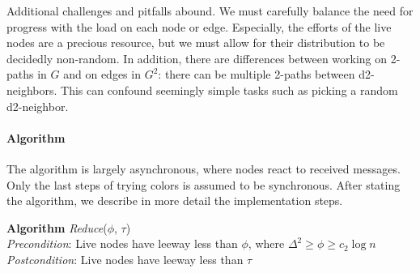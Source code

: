 Additional challenges and pitfalls abound. We must carefully balance the need for progress with the load on each node or edge. Especially, the efforts of the live nodes are a precious resource, but we must allow for their distribution to be decidedly non-random.  
In addition, there are differences between working on 2-paths in $G$ and on edges in $G^2$: there can be multiple 2-paths between d2-neighbors. This can confound seemingly simple tasks such as picking a random d2-neighbor.

\paragraph*{Algorithm} The algorithm  is largely asynchronous, where nodes react to received messages. Only the last steps of trying colors is assumed to be synchronous.
After stating the algorithm, we describe in more detail the implementation steps.
\bigskip

   \textbf{Algorithm} \emph{Reduce}($\phi$, $\tau$) \\
    \emph{Precondition}: Live nodes have leeway less than $\phi$, where $\Delta^2 \ge \phi \ge c_2\log n$ \\
    \emph{Postcondition}: Live nodes have leeway less than $\tau$


